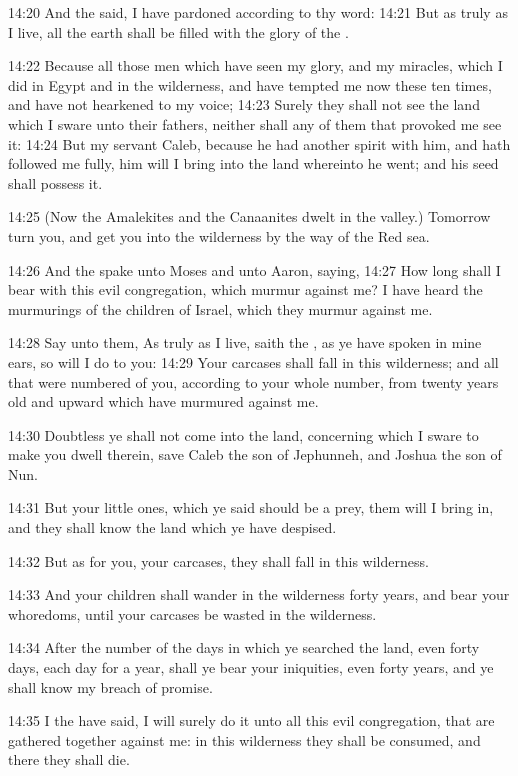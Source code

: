 14:20 And the \LORD said, I have pardoned according to thy word: 14:21 But as truly as I live, all the earth shall be filled with the glory of the \LORD.

14:22 Because all those men which have seen my glory, and my miracles, which I did in Egypt and in the wilderness, and have tempted me now these ten times, and have not hearkened to my voice; 14:23 Surely they shall not see the land which I sware unto their fathers, neither shall any of them that provoked me see it: 14:24 But my servant Caleb, because he had another spirit with him, and hath followed me fully, him will I bring into the land whereinto he went; and his seed shall possess it.

14:25 (Now the Amalekites and the Canaanites dwelt in the valley.)  Tomorrow turn you, and get you into the wilderness by the way of the Red sea.

14:26 And the \LORD spake unto Moses and unto Aaron, saying, 14:27 How long shall I bear with this evil congregation, which murmur against me? I have heard the murmurings of the children of Israel, which they murmur against me.

14:28 Say unto them, As truly as I live, saith the \LORD, as ye have spoken in mine ears, so will I do to you: 14:29 Your carcases shall fall in this wilderness; and all that were numbered of you, according to your whole number, from twenty years old and upward which have murmured against me.

14:30 Doubtless ye shall not come into the land, concerning which I sware to make you dwell therein, save Caleb the son of Jephunneh, and Joshua the son of Nun.

14:31 But your little ones, which ye said should be a prey, them will I bring in, and they shall know the land which ye have despised.

14:32 But as for you, your carcases, they shall fall in this wilderness.

14:33 And your children shall wander in the wilderness forty years, and bear your whoredoms, until your carcases be wasted in the wilderness.

14:34 After the number of the days in which ye searched the land, even forty days, each day for a year, shall ye bear your iniquities, even forty years, and ye shall know my breach of promise.

14:35 I the \LORD have said, I will surely do it unto all this evil congregation, that are gathered together against me: in this wilderness they shall be consumed, and there they shall die.

